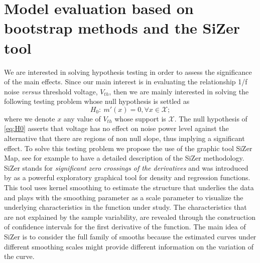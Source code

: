 \documentclass[sn-mathphys]{sn-jnl}%
\theoremstyle{thmstyleone}%
\theoremstyle{thmstyletwo}%
\theoremstyle{thmstylethree}%
\begin{document}
\section{Model evaluation based on bootstrap methods and the SiZer tool}\label{sec:sizer}

\noindent We are interested in solving hypothesis testing in order to assess the significance of the main effects. Since our main interest is in evaluating the relationship 1/f noise \textit{versus} threshold voltage, $V_{th}$, then we are mainly interested in solving the following testing problem whose null hypothesis is settled as
\begin{equation}\label{eq:H0}
	H_0: \   m'(x)=0, \forall x \in \mathcal{X}; 
\end{equation}
where we denote $x$ any value of $V_{th}$ whose support is $\mathcal{X}$. The null hypothesis of \eqref{eq:H0} asserts that voltage has no effect on noise power level against the alternative that there are regions of non null slope, thus implying a significant effect. 
To solve this testing problem we propose the use of the graphic tool SiZer Map, see for example \cite{GNR2020} to have a detailed description of the SiZer methodology.
SiZer stands for \textit{significant zero crossings of the derivatives} and was introduced by \cite{CM1999} as a powerful exploratory graphical tool for density and regression functions. This tool uses kernel smoothing to estimate the structure that underlies the data and plays with the smoothing parameter as a scale parameter to visualize the underlying characteristics in the function under study. The characteristics that are not explained by the sample variability, are revealed through the construction of confidence intervals for the first derivative of the function. The main idea of SiZer is to consider the full family of smooths because the estimated curves under different smoothing scales might provide different information on the variation of the curve. 
\end{document}
